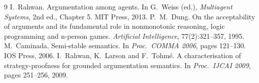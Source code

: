 \documentclass[11pt,a4paper]{article}
\begin{document}
\begin{thebibliography}{9}\small
{} I.~Rahwan. Argumentation among agents. In G.~Weiss (ed.),
  \emph{Multiagent Systems}, 2nd ed., Chapter 5. MIT Press, 2013.
 P.~M.~Dung. On the acceptability of arguments and its
  fundamental role in nonmonotonic reasoning, logic programming and n-person
  games. \emph{Artificial Intelligence}, 77(2):321--357, 1995.
 M.~Caminada. Semi-stable semantics. In \emph{Proc.\
  COMMA 2006}, pages 121--130. IOS Press, 2006.
 I.~Rahwan, K.~Larson and F.~Tohm\'e. A characterisation of
  strategy-proofness for grounded argumentation semantics. In \emph{Proc.\
  IJCAI 2009}, pages 251--256, 2009.
\end{thebibliography}
\end{document}
